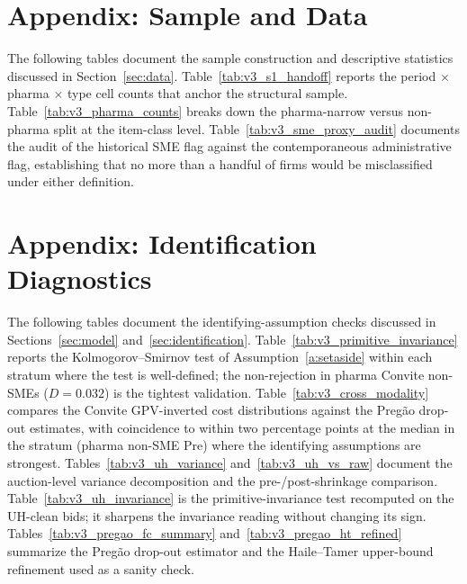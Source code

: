 \clearpage
\appendix

\section{Appendix: Sample and Data}\label{app:sample}

The following tables document the sample construction and descriptive statistics discussed in Section~\ref{sec:data}. Table~\ref{tab:v3_s1_handoff} reports the period $\times$ pharma $\times$ type cell counts that anchor the structural sample. Table~\ref{tab:v3_pharma_counts} breaks down the pharma-narrow versus non-pharma split at the item-class level. Table~\ref{tab:v3_sme_proxy_audit} documents the audit of the historical SME flag against the contemporaneous administrative flag, establishing that no more than a handful of firms would be misclassified under either definition.





\section{Appendix: Identification Diagnostics}\label{app:id}

The following tables document the identifying-assumption checks discussed in Sections~\ref{sec:model} and~\ref{sec:identification}. Table~\ref{tab:v3_primitive_invariance} reports the Kolmogorov--Smirnov test of Assumption~\ref{a:setaside} within each stratum where the test is well-defined; the non-rejection in pharma Convite non-SMEs ($D=0.032$) is the tightest validation. Table~\ref{tab:v3_cross_modality} compares the Convite GPV-inverted cost distributions against the Preg\~ao drop-out estimates, with coincidence to within two percentage points at the median in the stratum (pharma non-SME Pre) where the identifying assumptions are strongest. Tables~\ref{tab:v3_uh_variance} and~\ref{tab:v3_uh_vs_raw} document the auction-level variance decomposition and the pre-/post-shrinkage comparison. Table~\ref{tab:v3_uh_invariance} is the primitive-invariance test recomputed on the UH-clean bids; it sharpens the invariance reading without changing its sign. Tables~\ref{tab:v3_pregao_fc_summary} and~\ref{tab:v3_pregao_ht_refined} summarize the Preg\~ao drop-out estimator and the Haile--Tamer upper-bound refinement used as a sanity check.









